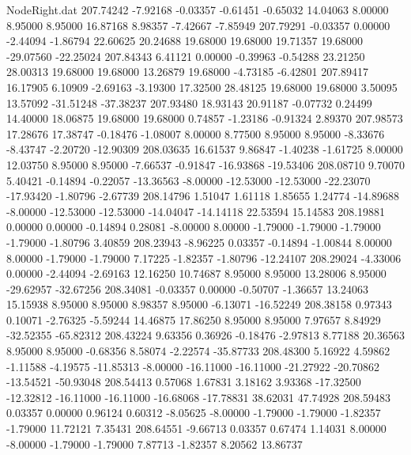 \begin{filecontents}{NodeRight.dat}
 207.74242   -7.92168   -0.03357    -0.61451   -0.65032   14.04063    8.00000    8.95000    8.95000   16.87168    8.98357   -7.42667   -7.85949
 207.79291   -0.03357    0.00000    -2.44094   -1.86794   22.60625   20.24688   19.68000   19.68000   19.71357   19.68000  -29.07560  -22.25024
 207.84343    6.41121    0.00000    -0.39963   -0.54288   23.21250   28.00313   19.68000   19.68000   13.26879   19.68000   -4.73185   -6.42801
 207.89417   16.17905    6.10909    -2.69163   -3.19300   17.32500   28.48125   19.68000   19.68000    3.50095   13.57092  -31.51248  -37.38237
 207.93480   18.93143   20.91187    -0.07732    0.24499   14.40000   18.06875   19.68000   19.68000    0.74857   -1.23186   -0.91324    2.89370
 207.98573   17.28676   17.38747    -0.18476   -1.08007    8.00000    8.77500    8.95000    8.95000   -8.33676   -8.43747   -2.20720  -12.90309
 208.03635   16.61537    9.86847    -1.40238   -1.61725    8.00000   12.03750    8.95000    8.95000   -7.66537   -0.91847  -16.93868  -19.53406
 208.08710    9.70070    5.40421    -0.14894   -0.22057  -13.36563   -8.00000  -12.53000  -12.53000  -22.23070  -17.93420   -1.80796   -2.67739
 208.14796    1.51047    1.61118     1.85655    1.24774  -14.89688   -8.00000  -12.53000  -12.53000  -14.04047  -14.14118   22.53594   15.14583
 208.19881    0.00000    0.00000    -0.14894    0.28081   -8.00000    8.00000   -1.79000   -1.79000   -1.79000   -1.79000   -1.80796    3.40859
 208.23943   -8.96225    0.03357    -0.14894   -1.00844    8.00000    8.00000   -1.79000   -1.79000    7.17225   -1.82357   -1.80796  -12.24107
 208.29024   -4.33006    0.00000    -2.44094   -2.69163   12.16250   10.74687    8.95000    8.95000   13.28006    8.95000  -29.62957  -32.67256
 208.34081   -0.03357    0.00000    -0.50707   -1.36657   13.24063   15.15938    8.95000    8.95000    8.98357    8.95000   -6.13071  -16.52249
 208.38158    0.97343    0.10071    -2.76325   -5.59244   14.46875   17.86250    8.95000    8.95000    7.97657    8.84929  -32.52355  -65.82312
 208.43224    9.63356    0.36926    -0.18476   -2.97813    8.77188   20.36563    8.95000    8.95000   -0.68356    8.58074   -2.22574  -35.87733
 208.48300    5.16922    4.59862    -1.11588   -4.19575  -11.85313   -8.00000  -16.11000  -16.11000  -21.27922  -20.70862  -13.54521  -50.93048
 208.54413    0.57068    1.67831     3.18162    3.93368  -17.32500  -12.32812  -16.11000  -16.11000  -16.68068  -17.78831   38.62031   47.74928
 208.59483    0.03357    0.00000     0.96124    0.60312   -8.05625   -8.00000   -1.79000   -1.79000   -1.82357   -1.79000   11.72121    7.35431
 208.64551   -9.66713    0.03357     0.67474    1.14031    8.00000   -8.00000   -1.79000   -1.79000    7.87713   -1.82357    8.20562   13.86737

\end{filecontents}
